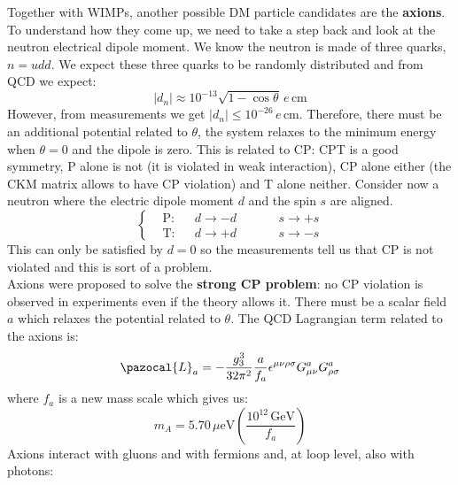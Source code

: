 \documentclass[10.75pt,a4paper,openright,bottom=2cm]{article}
\begin{document}
Together with WIMPs, another possible DM particle candidates are the \textbf{axions}. To understand how they come up, we need to take a step back and look at the neutron electrical dipole moment. We know the neutron is made of three quarks, $n=udd$. We expect these three quarks to be randomly distributed and from QCD we expect:
\[
|d_n|\approx10^{-13}\sqrt{1-\cos\theta}\,e\,\text{cm}
\]
However, from measurements we get $|d_n|\le10^{-26}\,e$\,cm. Therefore, there must be an additional potential related to $\theta$, the system relaxes to the minimum energy when $\theta=0$ and the dipole is zero. This is related to CP: CPT is a good symmetry, P alone is not (it is violated in weak interaction), CP alone either (the CKM matrix allows to have CP violation) and T alone neither. Consider now a neutron where the electric dipole moment $d$ and the spin $s$ are aligned.
\[
\left\{
\begin{aligned}
&\text{P}:&&d\to-d \quad &&&s\to+s\\
&\text{T}:&&d\to+d \quad &&&s\to-s
\end{aligned}
\right.
\]
This can only be satisfied by $d=0$ so the measurements tell us that CP is not violated and this is sort of a problem.\\
Axions were proposed to solve the \textbf{strong CP problem}: no CP violation is observed in experiments even if the theory allows it. There must be a scalar field $a$ which relaxes the potential related to $\theta$. The QCD Lagrangian term related to the axions is:
\[
\pazocal{L}_a=-\frac{g_3^3}{32\pi^2}\frac{a}{f_a}\epsilon^{\mu\nu\rho\sigma}G_{\mu\nu}^aG_{\rho\sigma}^a
\]
where $f_a$ is a new mass scale which gives us:
\[
m_A=5.70\,\text{$\mu$eV}\left(\frac{10^{12}\,\text{GeV}}{f_a}\right)
\]
Axions interact with gluons and with fermions and, at loop level, also with photons:\\
\begin{minipage}{0.5\textwidth}
\begin{center}
\end{center}
\end{minipage}\hspace*{-2cm}
\end{document}
